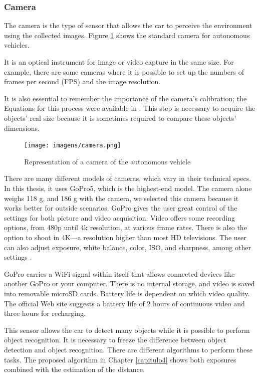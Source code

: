 \subsubsection{Camera}\label{sub:camera}
The camera is the type of sensor that allows the car to perceive the environment using the collected images. Figure \ref{fig:camera} shows the standard camera for autonomous vehicles.

It is an optical instrument for image or video capture in the same size. For example, there are some cameras where it is possible to set up the numbers of frames per second (FPS) and the image resolution. 

It is also essential to remember the importance of the camera's calibration; the Equations for this process were available in \cite{888718}. This step is necessary to acquire the objects' real size because it is sometimes required to compare these objects' dimensions. 

\begin{figure}[H]
\centering
\texttt{[image: imagens/camera.png]}
\caption{Representation of a camera of the autonomous vehicle \cite{site-camera}}
\label{fig:camera}
\end{figure}

There are many different models of cameras, which vary in their technical specs. In this thesis, it uses GoPro5, which is the highest-end model. The camera alone weighs 118 g, and 186 g with the camera, we selected this camera because it works better for outside scenarios. GoPro gives the user great control of the settings for both picture and video acquisition. Video offers some recording options, from 480p until 4k resolution, at various frame rates. There is also the option to shoot in 4K—a resolution higher than most HD televisions. The user can also adjust exposure, white balance, color, ISO, and sharpness, among other settings \cite{paro2015video}.

GoPro carries a WiFi signal within itself that allows connected devices like another GoPro or your computer. There is no internal storage, and video is saved into removable microSD cards. Battery life is dependent on which video quality. The official Web site suggests a battery life of 2 hours of continuous video and three hours for recharging.

This sensor allows the car to detect many objects while it is possible to perform object recognition. It is necessary to freeze the difference between object detection and object recognition. There are different algorithms to perform these tasks. The proposed algorithm in Chapter \ref{capitulo4} shows both exposures combined with the estimation of the distance. 

